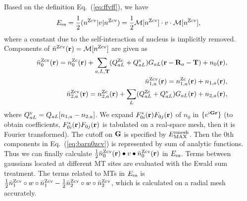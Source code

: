 \documentclass[twocolumn,showpacs,preprintnumbers,amsmath,amssymb,floatfix]{revtex4-1}
\newcommand{\bfr}{{\bf r}}
\newcommand{\bfT}{{\bf T}}
\newcommand{\bfG}{{\bf G}}
\newcommand{\bfR}{{\bf R}}
\newcommand{\req}[1]{\mbox{Eq.~\!(\ref{#1})}}
\def\EMAXm{ E^{\rm rmesh}_{\rm MAX} }
\def\EMAXm{ E^{\rm rmesh}_{\rm MAX} }
\def\nc{n^{\rm c}}
\def\nzc{n^{\rm Zc}}
\def\nzcv{n^{\rm Zcv}}
\def\barnzcv{\bar{n}^{\rm Zcv}}
\def\MM{{\cal M}}
\def\RR{w}
\def\rhoij{\rho_{ij}}
\begin{document}
\begin{widetext}
Based on the definition \req{eq:ffvff}, we have
\begin{eqnarray}
E_{\rm es}= \frac{1}{2} (\nzcv|v|\nzcv)=\frac{1}{2} \MM[\nzcv] \cdot v \cdot \MM[\nzcv],
\label{eq:es}
\end{eqnarray}
where a constant due to the self-interaction of nucleus is implicitly
removed. 
Components of $\barnzcv(\bfr)=\MM[\nzcv]$ are given as
\begin{eqnarray}
&&\barnzcv_0(\bfr)= \nzc_{0}(\bfr)
+ \sum_{a,L,\bfT} 
(Q_{aL}^{\rm Zc}+Q^{\rm v}_{aL})G_{aL}(\bfr-\bfR_a-\bfT)+ n_0(\bfr),
\label{eq:barn0zcv}\\
&&\barnzcv_{1,a}(\bfr)=\nzc_{1,a}(\bfr) +n_{1,a}(\bfr), \label{eq:barn1zcv}\\
&&\barnzcv_{2,a}(\bfr)=\nzc_{2,a}(\bfr) 
+\sum_L (Q_{aL}^{\rm Zc}+Q^{\rm v}_{aL})G_{aL}(\bfr)+n_{2,a}(\bfr),\label{eq:barn2zcv}
\end{eqnarray}
where $Q^{\rm v}_{aL}=Q_{aL}[n_{1,a}-n_{2,a}]$.  We expand
$F^*_{0i}(\bfr)F_{0j}(\bfr)$ of $n_0$ in $\{e^{i \bfG \bfr}\}$ (to
obtain coefficients, $F^*_{0i}(\bfr)F_{0j}(\bfr)$ is tabulated on a
real-space mesh, then it is Fourier transformed).  The cutoff on $\bfG$
is specified by $\EMAXm$.  Then the 0th components in \req{eq:barn0zcv}
is represented by sum of analytic functions. Thus we can finally
calculate $\frac{1}{2} \barnzcv_0(\bfr) \bullet v \bullet
\barnzcv_0(\bfr)$ in $E_{\rm es}$.  Terms between gaussians located at
different MT sites are evaluated with the Ewald sum treatment.  The
terms related to MTs in $E_{\rm es}$ is $ \frac{1}{2} \barnzcv_1 \circ
\RR \circ \barnzcv_1 - \frac{1}{2} \barnzcv_2 \circ \RR \circ
\barnzcv_2$, which is calculated on a radial mesh accurately.


\end{widetext}
\end{document}
